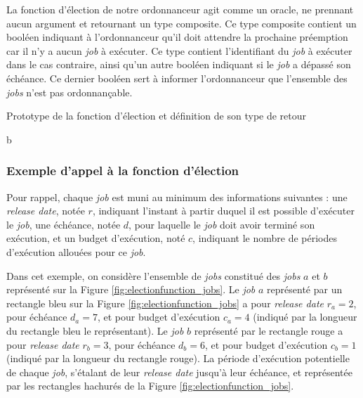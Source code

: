 		La fonction d'élection de notre ordonnanceur agit comme un oracle, ne prennant aucun argument et retournant un type composite. Ce type composite contient un booléen indiquant à l'ordonnanceur qu'il doit attendre la prochaine préemption car il n'y a aucun \emph{job} à exécuter. Ce type contient l'identifiant du \emph{job} à exécuter dans le cas contraire, ainsi qu'un autre booléen indiquant si le \emph{job} a dépassé son échéance. Ce dernier booléen sert à informer l'ordonnanceur que l'ensemble des \emph{jobs} n'est pas ordonnançable.

		\begin{listing}[!ht]
			\caption{Prototype de la fonction d'élection et définition de son type de retour }
		\end{listing}

b\begin{figure}[!b]
		\end{figure}
			\subsubsection{Exemple d'appel à la fonction d'élection}

			Pour rappel, chaque \emph{job} est muni au minimum des informations suivantes : une \emph{release date}, notée $r$, indiquant l'instant à partir duquel il est possible d'exécuter le \emph{job}, une échéance, notée $d$, pour laquelle le \emph{job} doit avoir terminé son exécution, et un budget d'exécution, noté $c$, indiquant le nombre de périodes d'exécution allouées pour ce \emph{job}.

			Dans cet exemple, on considère l'ensemble de \emph{jobs} constitué des \emph{jobs} $a$ et $b$ représenté sur la Figure \ref{fig:electionfunction_jobs}. Le \emph{job} $a$ représenté par un rectangle bleu sur la Figure \ref{fig:electionfunction_jobs} a pour \emph{release date} $r_a = 2$, pour échéance $d_a = 7$, et pour budget d'exécution $c_a = 4$ (indiqué par la longueur du rectangle bleu le représentant). Le \emph{job} $b$ représenté par le rectangle rouge a pour \emph{release date} $r_b = 3$, pour échéance $d_b = 6$, et pour budget d'exécution $c_b = 1$ (indiqué par la longueur du rectangle rouge). La période d'exécution potentielle de chaque \emph{job}, s'étalant de leur \emph{release date} jusqu'à leur échéance, et représentée par les rectangles hachurés de la Figure \ref{fig:electionfunction_jobs}.

